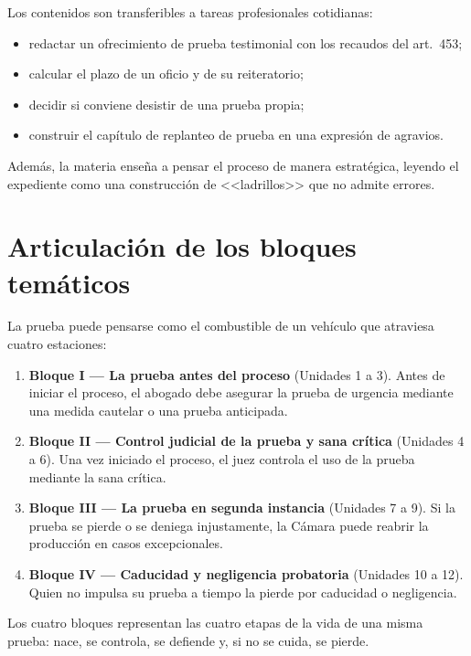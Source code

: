 \documentclass[12pt,oneside]{book}
\begin{document}
Los contenidos son transferibles a tareas profesionales cotidianas:

\begin{itemize}
    \item redactar un ofrecimiento de prueba testimonial con los recaudos del art.\ 453;
    \item calcular el plazo de un oficio y de su reiteratorio;
    \item decidir si conviene desistir de una prueba propia;
    \item construir el capítulo de replanteo de prueba en una expresión de agravios.
\end{itemize}

Además, la materia enseña a pensar el proceso de manera estratégica, leyendo el expediente como una construcción de <<ladrillos>> que no admite errores.

\section{Articulación de los bloques temáticos}

La prueba puede pensarse como el combustible de un vehículo que atraviesa cuatro estaciones:

\begin{enumerate}
    \item \textbf{Bloque I --- La prueba antes del proceso} (Unidades 1 a 3). Antes de iniciar el proceso, el abogado debe asegurar la prueba de urgencia mediante una medida cautelar o una prueba anticipada.
    \item \textbf{Bloque II --- Control judicial de la prueba y sana crítica} (Unidades 4 a 6). Una vez iniciado el proceso, el juez controla el uso de la prueba mediante la sana crítica.
    \item \textbf{Bloque III --- La prueba en segunda instancia} (Unidades 7 a 9). Si la prueba se pierde o se deniega injustamente, la Cámara puede reabrir la producción en casos excepcionales.
    \item \textbf{Bloque IV --- Caducidad y negligencia probatoria} (Unidades 10 a 12). Quien no impulsa su prueba a tiempo la pierde por caducidad o negligencia.
\end{enumerate}

Los cuatro bloques representan las cuatro etapas de la vida de una misma prueba: nace, se controla, se defiende y, si no se cuida, se pierde.

\end{document}
